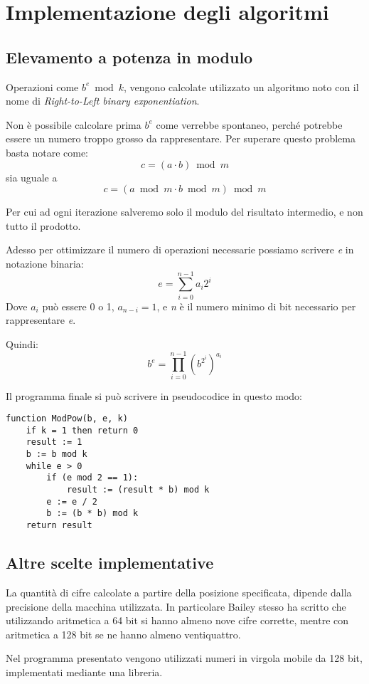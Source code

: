 \section{Implementazione degli algoritmi}
\label{sec:impl}
\subsection{Elevamento a potenza in modulo}
\label{sec:impl_pot}
Operazioni come $b^e\bmod{k}$, vengono calcolate utilizzato un algoritmo noto con il nome di \textit{Right-to-Left binary exponentiation}\cite[p. 463]{Knuth}.

Non è possibile calcolare prima $b^e$ come verrebbe spontaneo, perché potrebbe essere un numero troppo grosso da rappresentare. Per superare questo problema basta notare come:
$$c = (a \cdot b)\bmod{m}$$
sia uguale a
$$c = (a\bmod{m} \cdot b\bmod{m})\bmod{m}$$

\noindent Per cui ad ogni iterazione salveremo solo il modulo del risultato intermedio, e non tutto il prodotto.

Adesso per ottimizzare il numero di operazioni necessarie possiamo scrivere \textit{e} in notazione binaria:
$$e = \sum\limits_{i=0}^{n-1} a_i 2^i$$
Dove $a_i$ può essere 0 o 1, $a_{n-i} = 1$, e \textit{n} è il numero minimo di bit necessario per rappresentare \textit{e}.

Quindi:
$$b^e = \prod\limits_{i=0}^{n-1} (b^{2^i})^{a_i}$$

\noindent Il programma finale si può scrivere in pseudocodice in questo modo:

\begin{mdframed}[backgroundcolor=bg]
\begin{verbatim}
function ModPow(b, e, k)
    if k = 1 then return 0
    result := 1
    b := b mod k
    while e > 0
        if (e mod 2 == 1):
            result := (result * b) mod k
        e := e / 2
        b := (b * b) mod k
    return result
\end{verbatim}
\end{mdframed}

\subsection{Altre scelte implementative}

La quantità di cifre calcolate a partire della posizione specificata, dipende dalla precisione della macchina utilizzata. In particolare Bailey stesso ha scritto che utilizzando aritmetica a 64 bit si hanno almeno nove cifre corrette, mentre con aritmetica a 128 bit se ne hanno almeno ventiquattro.\cite[p.\ 4-5]{Bailey}

Nel programma presentato vengono utilizzati numeri in virgola mobile da 128 bit, implementati mediante una libreria.